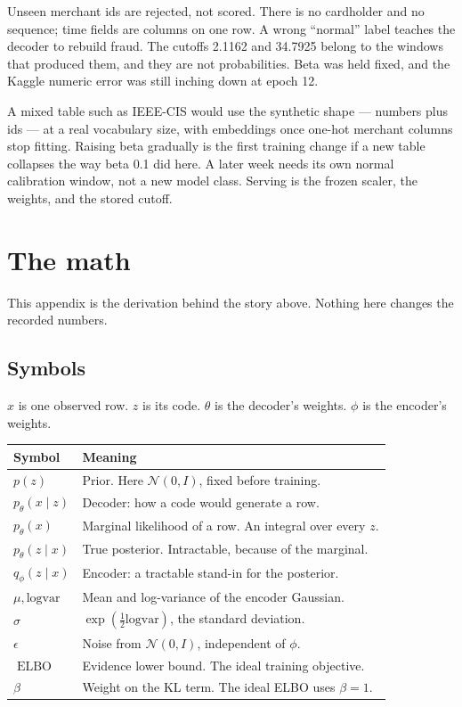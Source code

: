 \documentclass[11pt]{article}
\begin{document}
Unseen merchant ids are rejected, not scored. There is no cardholder and
no sequence; time fields are columns on one row. A wrong ``normal'' label
teaches the decoder to rebuild fraud. The cutoffs 2.1162 and 34.7925
belong to the windows that produced them, and they are not probabilities.
Beta was held fixed, and the Kaggle numeric error was still inching down
at epoch 12.

A mixed table such as IEEE-CIS would use the synthetic shape --- numbers
plus ids --- at a real vocabulary size, with embeddings once one-hot
merchant columns stop fitting. Raising beta gradually is the first
training change if a new table collapses the way beta 0.1 did here.
A later week needs its own normal calibration window, not a new model
class. Serving is the frozen scaler, the weights, and the stored cutoff.

\clearpage
\appendix
\section{The math}
\label{sec:math}

This appendix is the derivation behind the story above.
Nothing here changes the recorded numbers.

\subsection{Symbols}

$x$ is one observed row. $z$ is its code. $\theta$ is the decoder's
weights. $\phi$ is the encoder's weights.

\begin{center}
\small
\begin{tabular}{@{}l>{\raggedright\arraybackslash}p{}@{}}
\toprule
Symbol & Meaning \\
\midrule
$p(z)$ & Prior. Here $\mathcal{N}(0,I)$, fixed before training. \\
$p_{\theta}(x\mid z)$ & Decoder: how a code would generate a row. \\
$p_{\theta}(x)$ & Marginal likelihood of a row. An integral over every $z$. \\
$p_{\theta}(z\mid x)$ & True posterior. Intractable, because of the marginal. \\
$q_{\phi}(z\mid x)$ & Encoder: a tractable stand-in for the posterior. \\
$\mu,\mathrm{logvar}$ & Mean and log-variance of the encoder Gaussian. \\
$\sigma$ & $\exp(\tfrac{1}{2}\mathrm{logvar})$, the standard deviation. \\
$\epsilon$ & Noise from $\mathcal{N}(0,I)$, independent of $\phi$. \\
$\operatorname{ELBO}$ & Evidence lower bound. The ideal training objective. \\
$\beta$ & Weight on the KL term. The ideal ELBO uses $\beta=1$. \\
\bottomrule
\end{tabular}
\end{center}
\end{document}

